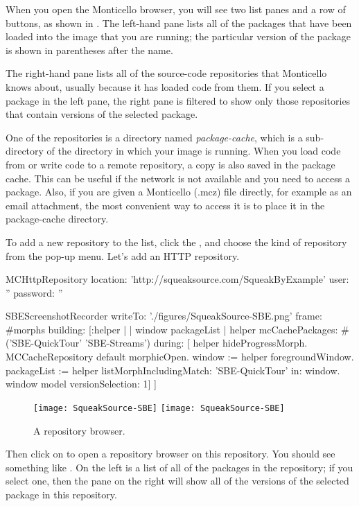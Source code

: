 \documentclass[a4paper,10pt,twoside]{book}
\begin{document}
When you open the Monticello browser, you will see two list panes and a row of buttons, as shown in .
The left-hand pane lists all of the packages that have been loaded into the image that you are running; the particular version of the package is shown in parentheses after the name.

The right-hand pane lists all of the source-code repositories that Monticello knows about, usually because it has loaded code from them.  If you select a package in the left pane, the right pane is filtered to show only those repositories that contain versions of the selected package.

One of the repositories is a directory named \emph{package-cache}, which is a sub-directory of the directory in which your image is running.
When you load code from or write code to a remote repository, a copy is also saved in the package cache.
This can be useful if the network is not available and you need to access a package.
Also, if you are given a Monticello (.mcz) file directly, for example as an email attachment, the most convenient way to access it is to place it in the package-cache directory.

To add a new repository to the list, click the , and choose the kind of repository from the pop-up menu.
Let's add an HTTP repository.

\begin{code}{}
MCHttpRepository
	location: 'http://squeaksource.com/SqueakByExample'
	user: ''
	password: ''
\end{code}

\begin{ExecuteSmalltalkScript}
SBEScreenshotRecorder writeTo: './figures/SqueakSource-SBE.png' frame: #morphs building: [:helper |
	| window packageList |
	helper mcCachePackages: #('SBE-QuickTour' 'SBE-Streams') during: [
		helper hideProgressMorph.
		MCCacheRepository default morphicOpen.
		window := helper foregroundWindow.
		packageList := helper listMorphIncludingMatch: 'SBE-QuickTour' in: window.
		window model versionSelection: 1]
]
\end{ExecuteSmalltalkScript}
\begin{figure}[btp]
	\begin{center}
	\ifluluelse
		{\texttt{[image: SqueakSource-SBE]}}
		{\texttt{[image: SqueakSource-SBE]}}
	\end{center}
	\caption{A repository browser.}
	\label{fig:SqueakSource:SBE}
\end{figure}
\noindent
Then click on  to open a repository browser on this repository.
You should see something like .
On the left is a list of all of the packages in the repository; if you select one, then the pane on the right will show all of the versions of the selected package in this repository.
\end{document}
